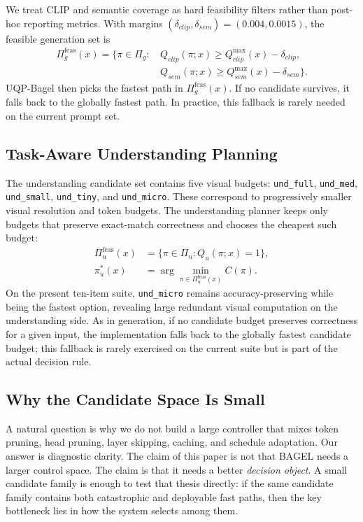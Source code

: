 \documentclass{article}
\begin{document}
We treat CLIP and semantic coverage as hard feasibility filters rather than post-hoc reporting metrics. With margins $(\delta_{clip}, \delta_{sem}) = (0.004, 0.0015)$, the feasible generation set is
\begin{align}
\Pi_g^{\mathrm{feas}}(x) = \{\pi\in\Pi_g :\, &Q_{clip}(\pi;x) \geq Q_{clip}^{\max}(x)-\delta_{clip}, \\
&Q_{sem}(\pi;x) \geq Q_{sem}^{\max}(x)-\delta_{sem}\}.
\end{align}
UQP-Bagel then picks the fastest path in $\Pi_g^{\mathrm{feas}}(x)$. If no candidate survives, it falls back to the globally fastest path. In practice, this fallback is rarely needed on the current prompt set.

\subsection{Task-Aware Understanding Planning}
The understanding candidate set contains five visual budgets: \texttt{und\_full}, \texttt{und\_med}, \texttt{und\_small}, \texttt{und\_tiny}, and \texttt{und\_micro}. These correspond to progressively smaller visual resolution and token budgets. The understanding planner keeps only budgets that preserve exact-match correctness and chooses the cheapest such budget:
\begin{align}
\Pi_u^{\mathrm{feas}}(x) &= \{\pi\in\Pi_u : Q_u(\pi;x)=1\}, \\
\pi_u^*(x) &= \arg\min_{\pi\in\Pi_u^{\mathrm{feas}}(x)} C(\pi).
\end{align}
On the present ten-item suite, \texttt{und\_micro} remains accuracy-preserving while being the fastest option, revealing large redundant visual computation on the understanding side. As in generation, if no candidate budget preserves correctness for a given input, the implementation falls back to the globally fastest candidate budget; this fallback is rarely exercised on the current suite but is part of the actual decision rule.

\subsection{Why the Candidate Space Is Small}
A natural question is why we do not build a large controller that mixes token pruning, head pruning, layer skipping, caching, and schedule adaptation. Our answer is diagnostic clarity. The claim of this paper is not that BAGEL needs a larger control space. The claim is that it needs a better \emph{decision object}. A small candidate family is enough to test that thesis directly: if the same candidate family contains both catastrophic and deployable fast paths, then the key bottleneck lies in how the system selects among them.
\end{document}
